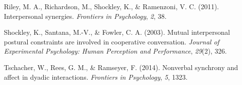 \documentclass[10pt, letterpaper]{article}
\begin{document}
\hypertarget{ref-riley2011interpersonal}{}
Riley, M. A., Richardson, M., Shockley, K., \& Ramenzoni, V. C. (2011).
Interpersonal synergies. \emph{Frontiers in Psychology}, \emph{2}, 38.

\hypertarget{ref-shockley2003mutual}{}
Shockley, K., Santana, M.-V., \& Fowler, C. A. (2003). Mutual
interpersonal postural constraints are involved in cooperative
conversation. \emph{Journal of Experimental Psychology: Human Perception
and Performance}, \emph{29}(2), 326.

\hypertarget{ref-tschacher2014nonverbal}{}
Tschacher, W., Rees, G. M., \& Ramseyer, F. (2014). Nonverbal synchrony
and affect in dyadic interactions. \emph{Frontiers in Psychology},
\emph{5}, 1323.
\end{document}
